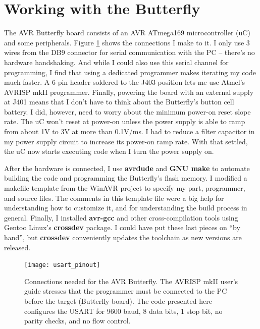 \section{Working with the Butterfly}
The AVR Butterfly board consists of an AVR ATmega169 microcontroller (uC) and some peripherals.  Figure \ref{fig:connections} shows the connections I make to it.  I only use 3 wires from the DB9 connector for serial communication with the PC -- there's no hardware handshaking.  And while I could also use this serial channel for programming, I find that using a dedicated programmer makes iterating my code much faster.  A 6-pin header soldered to the J403 position lets me use Atmel's AVRISP mkII programmer.  Finally, powering the board with an external supply at J401 means that I don't have to think about the Butterfly's button cell battery.  I did, however, need to worry about the minimum power-on reset slope rate.  The uC won't reset at power-on unless the power supply is able to ramp from about 1V to 3V at more than 0.1V/ms.  I had to reduce a filter capacitor in my power supply circuit to increase its power-on ramp rate.  With that settled, the uC now starts executing code when I turn the power supply on.

After the hardware is connected, I use \textbf{avrdude}\cite{avrdude} and \textbf{GNU make}\cite{gnumake} to automate building the code and programming the Butterfly's flash memory.  I modified a makefile template from the WinAVR project\cite{winavr} to specify my part, programmer, and source files.  The comments in this template file were a big help for understanding how to customize it, and for understanding the build process in general.  Finally, I installed \textbf{avr-gcc} and other cross-compilation tools using Gentoo Linux's \textbf{crossdev} package.  I could have put these last pieces on ``by hand'', but \textbf{crossdev} conveniently updates the toolchain as new versions are released.     

\begin{figure}[ht]
    \begin{center}
        \texttt{[image: usart\_pinout]}
        \caption{Connections needed for the AVR Butterfly.  The AVRISP mkII user's guide stresses that the programmer must be connected to the PC before the target (Butterfly board).  The code presented here configures the USART for 9600 baud, 8 data bits, 1 stop bit, no parity checks, and no flow control. \label{fig:connections}}
    \end{center}
\end{figure}

